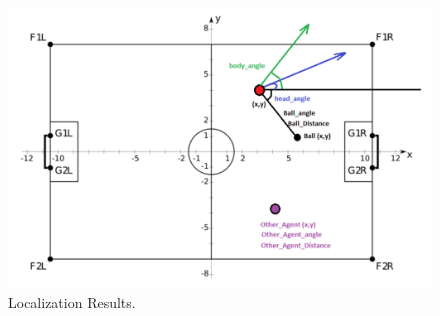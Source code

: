 \begin{figure}[!ht]
\centering
  \includegraphics[scale=0.3]{Chapter3/figures/Localization.png}
  \caption{Localization Results.} 
  \label{fig:LocalizationResults}
\end{figure}


